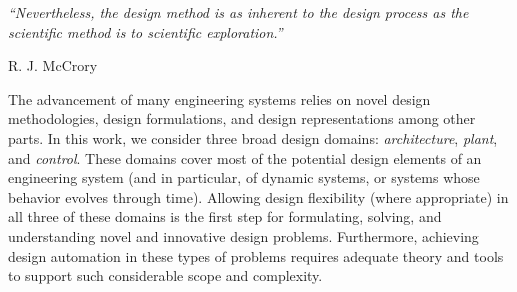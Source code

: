 

\epigraph{\textit{``Nevertheless, the design method is as inherent to the design process as the scientific method is to scientific exploration.''}}{\textmd{R. J. McCrory} \cite[p.~12]{McCrory1966a}}

The advancement of many engineering systems relies on novel design methodologies, design formulations, and design representations among other parts.
In this work, we consider three broad design domains: \textit{architecture}, \textit{plant}, and \textit{control}.
These domains cover most of the potential design elements of an engineering system (and in particular, of dynamic systems, or systems whose behavior evolves through time).
Allowing design flexibility (where appropriate) in all three of these domains is the first step for formulating, solving, and understanding novel and innovative design problems.
Furthermore, achieving design automation in these types of problems requires adequate theory and tools to support such considerable scope and complexity. 









